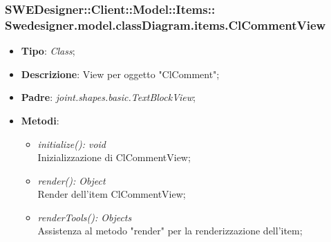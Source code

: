 \documentclass[../DefinizioneDiProdotto.tex]{subfiles}
\begin{document}
			\subsubsection[Swedesigner.model.classDiagram.items.ClCommentView]{SWEDesigner::Client::Model::Items::\\Swedesigner.model.classDiagram.items.ClCommentView}
			\hypertarget{SWEDesigner::Client::Model::Items::Swedesigner.model.classDiagram.items.ClCommentView}{}
			\begin{itemize}
				\item \textbf{Tipo}: \emph{Class};
				\item \textbf{Descrizione}: View per oggetto "ClComment";
				\item \textbf{Padre}: \emph{joint.shapes.basic.TextBlockView};
				\item \textbf{Metodi}:
				\begin{itemize}
					\item \emph{initialize(): void}\\
					Inizializzazione di ClCommentView;
					\item \emph{render(): Object}\\
					Render dell'item ClCommentView;
					\item \emph{renderTools(): Objects}\\
					Assistenza al metodo "render" per la renderizzazione dell'item;
				\end{itemize}
			\end{itemize}
			
\end{document}
